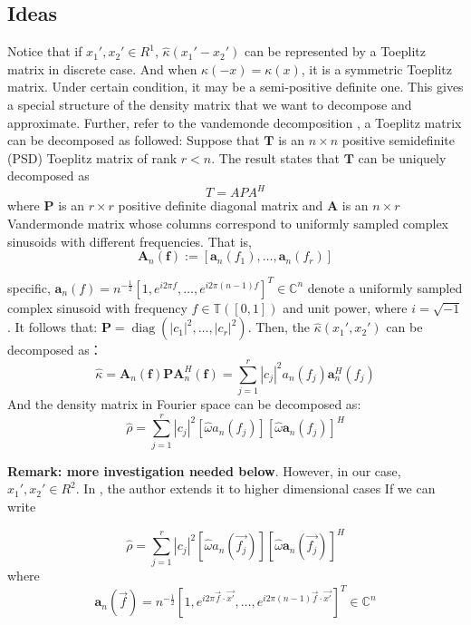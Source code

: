 \documentclass{article}
\numberwithin{equation}{section}
\begin{document}
  
  \subsection{Ideas}
  Notice that if $x_1',x_2'\in R^1$, $\hat{\kappa}(x_1' - x_2')$ can be represented by a Toeplitz matrix in discrete case. And when $\kappa(-x) = \kappa(x) $, it is a symmetric Toeplitz matrix. Under certain condition, it may be a semi-positive definite one. This gives a special structure of the density matrix that we want to decompose and approximate. Further, refer to the vandemonde decomposition \cite{multilevel vandemonde decomposition}, a Toeplitz matrix can be decomposed as followed:
   	Suppose that $\boldsymbol{T}$ is an $n \times n$ positive semidefinite (PSD) Toeplitz matrix of rank $r<n$. The result states that $\boldsymbol{T}$ can be uniquely decomposed as
  	$$
  	T=A P A^{H}
  	$$
  	where $\boldsymbol{P}$ is an $r \times r$ positive definite diagonal matrix and $\boldsymbol{A}$ is an $n \times r$ Vandermonde matrix whose columns correspond to uniformly sampled complex sinusoids with different frequencies. That is, 
  	$$
  	\boldsymbol{A}_{n}(\boldsymbol{f}):=\left[\boldsymbol{a}_{n}\left(f_{1}\right), \ldots, \boldsymbol{a}_{n}\left(f_{r}\right)\right]
  	$$

specific,  $\boldsymbol{a}_{n}(f)=n^{-\frac{1}{2}}\left[1, e^{i 2 \pi f}, \ldots, e^{i 2 \pi(n-1) f}\right]^{T} \in \mathbb{C}^{n}$ denote a uniformly sampled complex sinusoid with frequency $f \in \mathbb{T} ([0,1])$ and unit power, where $i=\sqrt{-1}$. 
It follows that:
$\boldsymbol{P}=\operatorname{diag}\left(\left|c_{1}\right|^{2}, \ldots,\left|c_{r}\right|^{2}\right)$. Then, the $\hat{\kappa}(x_1',x_2')$ can be decomposed as：
$$
\hat{\kappa}=\boldsymbol{A}_{n}(\boldsymbol{f}) \boldsymbol{P} \boldsymbol{A}_{n}^{H}(\boldsymbol{f})=\sum_{j=1}^{r}\left|c_{j}\right|^{2} a_{n}\left(f_{j}\right) \boldsymbol{a}_{n}^{H}\left(f_{j}\right)
$$
And the density matrix in Fourier space can be decomposed as:
$$
\hat{\rho} = \sum_{j=1}^{r}\left|c_{j}\right|^{2} [\hat{\omega} a_{n}\left(f_{j}\right)][\hat{\omega} \boldsymbol{a}_{n}\left(f_{j}\right)]^{H}
$$

\textbf{Remark: more investigation needed below}. 
However, in our case, $x_1',x_2' \in R^2$. In \cite{multilevel vandemonde decomposition}, the author extends it to higher dimensional cases 
If we can write

$$
\hat{\rho} = \sum_{j=1}^{r}\left|c_{j}\right|^{2} [\hat{\omega} a_{n}\left(\overrightarrow{f_{j}}\right)][\hat{\omega} \boldsymbol{a}_{n}\left(\overrightarrow{f_{j}}\right)]^{H}
$$
where
 $$
\boldsymbol{a}_{n}(\overrightarrow{f})=n^{-\frac{1}{2}}\left[1, e^{i 2 \pi \overrightarrow{f} \cdot \overrightarrow{x'}} , \ldots, e^{i 2 \pi(n-1) \overrightarrow{f} \cdot \overrightarrow{x'} } \right]^{T} \in \mathbb{C}^{n}
$$ 
\end{document}
